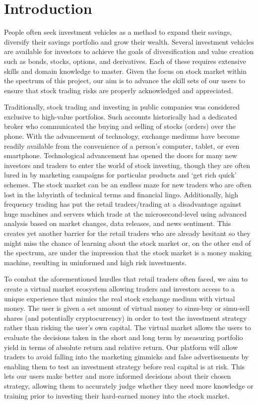 
\section{Introduction}
    \label{sec:intro}



People often seek investment vehicles as a method to expand their savings, diversify their savings portfolio and grow their wealth. Several investment vehicles are available for investors to achieve the goals of diversification and value creation such as bonds, stocks, options, and derivatives. Each of these requires extensive skills and domain knowledge to master. Given the focus on stock market within the spectrum of this project, our aim is to advance the skill sets of our users to ensure that stock trading risks are properly acknowledged and appreciated. 

Traditionally, stock trading and investing in public companies was considered exclusive to high-value portfolios. Such accounts historically had a dedicated broker who communicated the buying and selling of stocks (orders) over the phone. With the advancement of technology, exchange mediums have become readily available from the convenience of a person's computer, tablet, or even smartphone. Technological advancement has opened the doors for many new investors and traders to enter the world of stock investing, though they are often lured in by marketing campaigns for particular products and `get rich quick’ schemes. The stock market can be an endless maze for new traders who are often lost in the labyrinth of technical terms and financial lingo. Additionally, high frequency trading has put the retail traders/trading at a disadvantage against huge machines and servers which trade at the microsecond-level using advanced analysis based on market changes, data releases, and news sentiment. This creates yet another barrier for the retail traders who are already hesitant so they might miss the chance of learning about the stock market or, on the other end of the spectrum, are under the impression that the stock market is a money making machine, resulting in uninformed and high risk investments.

To combat the aforementioned hurdles that retail traders often faced, we aim to create a virtual market ecosystem allowing traders and investors access to a unique experience that mimics the real stock exchange medium with virtual money. The user is given a set amount of virtual money to simu-buy or simu-sell shares (and potentially cryptocurrency) in order to test the investment strategy rather than risking the user’s own capital. The virtual market allows the users to evaluate the decisions taken in the short and long term by measuring portfolio yield in terms of absolute return and relative return. Our platform will allow traders to avoid falling into the marketing gimmicks and false advertisements by enabling them to test an investment strategy before real capital is at risk. This lets our users make better and more informed decisions about their chosen strategy, allowing them to accurately judge whether they need more knowledge or training prior to investing their hard-earned money into the stock market.
